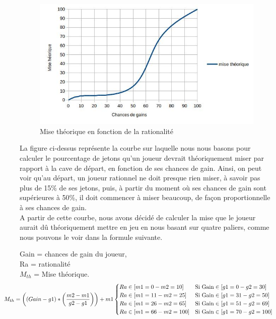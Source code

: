 \documentclass{report}
\begin{document}
\begin{figure}[H]
	\begin{center}
		\includegraphics[scale=0.5]{./imagesRapport/courbeRationaliteMiseTheorique.jpg}
	\end{center}
	\caption[Mise théorique en fonction de la rationalité]{Mise théorique en fonction de la rationalité}
\end{figure}

La figure ci-dessus représente la courbe sur laquelle nous nous basons pour calculer le pourcentage de jetons qu'un joueur devrait théoriquement miser par rapport à la cave de départ, en fonction de ses chances de gain. Ainsi, on peut voir qu'au départ, un joueur rationnel ne doit presque rien miser, à savoir pas plus de 15\% de ses jetons, puis, à partir du moment où ses chances de gain sont supérieures à 50\%, il doit commencer à miser beaucoup, de façon proportionnelle à ses chances de gain.\\

A partir de cette courbe, nous avons décidé de calculer la mise que le joueur aurait dû théoriquement mettre en jeu en nous basant sur quatre paliers, comme nous pouvons le voir dans la formule suivante. \par

\small{
 	Gain = chances de gain du joueur,\\
Ra = rationalité\\
$M_{th}$ = Mise théorique.\\

\begin{align*}
	\hspace{-1cm}M_{th} = \left((Gain - g1) * \left(\frac{m2-m1}{g2-g1}\right)\right)+m1
	\begin{cases}
		Ra \in [m1=0 - m2=10] &\text{Si Gain} \in [g1=0 - g2=30]\\
		Ra \in [m1=11 - m2=25] &\text{Si Gain} \in [g1=31 - g2=50]\\
		Ra \in [m1=26 - m2=65] &\text{Si Gain} \in [g1=51 - g2=69]\\
		Ra \in [m1=66 - m2=100] &\text{Si Gain} \in [g1=70 - g2=100]\\
	\end{cases}
\end{align*}
}
\end{document}
